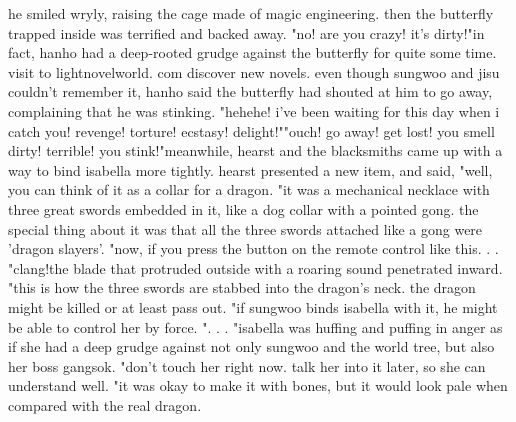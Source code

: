 he smiled wryly, raising the cage made of magic engineering.
 then the butterfly trapped inside was terrified and backed away.
"no! are you crazy! it's dirty!"in fact, hanho had a deep-rooted grudge against the butterfly for quite some time.
visit to lightnovelworld.
com discover new novels.
even though sungwoo and jisu couldn't remember it, hanho said the butterfly had shouted at him to go away, complaining that he was stinking.
"hehehe! i've been waiting for this day when i catch you! revenge! torture! ecstasy! delight!""ouch! go away! get lost! you smell dirty! terrible! you stink!"meanwhile, hearst and the blacksmiths came up with a way to bind isabella more tightly.
hearst presented a new item, and said, "well, you can think of it as a collar for a dragon.
"it was a mechanical necklace with three great swords embedded in it, like a dog collar with a pointed gong.
 the special thing about it was that all the three swords attached like a gong were 'dragon slayers'.
"now, if you press the button on the remote control like this.
.
.
"clang!the blade that protruded outside with a roaring sound penetrated inward.
"this is how the three swords are stabbed into the dragon's neck.
 the dragon might be killed or at least pass out.
"if sungwoo binds isabella with it, he might be able to control her by force.
".
.
.
"isabella was huffing and puffing in anger as if she had a deep grudge against not only sungwoo and the world tree, but also her boss gangsok.
"don't touch her right now.
 talk her into it later, so she can understand well.
"it was okay to make it with bones, but it would look pale when compared with the real dragon.

